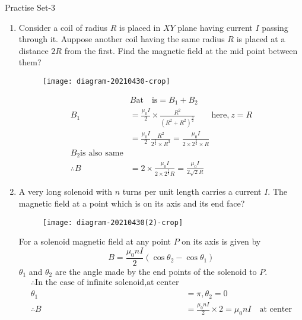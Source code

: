 \newpage
\begin{abox}
	Practise Set-3
\end{abox}
\begin{enumerate}[ label=\color{ocre}\textbf{\arabic*.}]
	\item Consider a coil of radius $R$ is placed in $XY$ plane having current $I$ passing through it. Auppose another coil having the same radius $R$ is placed at a distance $2R$ from the first. Find the magnetic field at the mid point between them?
	\begin{figure}[H]
		\begin{center}
			\texttt{[image: diagram-20210430-crop]}
		\end{center}
	\end{figure}
	\begin{answer}
		\begin{align*}
		&B \text{at}\quad\text{is}=B_1+B_2\\
		B_1&=\frac{\mu_{0} I}{2}\times\frac{R^2}{(R^2+R^2)^\frac{3}{2}}\qquad \text{here,}\ z=R\\
		&=\frac{\mu_0 I}{2}\frac{R^2}{2^\frac{3}{2}\times R^3}=\frac{\mu_0 I}{2\times2^\frac{3}{2}\times R}\\
		B_2 \text{is also same}\\
		\therefore B&=2\times\frac{\mu_0 I}{2\times2^\frac{2}{3}R}=\frac{\mu_0I}{2\sqrt{2}R}
		\end{align*}
	\end{answer}
	\item  A very long solenoid with $n$ turns per unit length carries a current $I$. The magnetic field at a point which is on its axis and its end face?
	\begin{figure}[H]
		\begin{center}
			\texttt{[image: diagram-20210430(2)-crop]}
		\end{center}
	\end{figure}
	\begin{answer}
		For a solenoid magnetic field at any point $P$ on its axis is given by
		$$B=\frac{\mu_0 nI}{2}(\cos\theta_2-\cos\theta_1)$$
		$\theta_1$ and $\theta_2$ are the angle made by the end points of the solenoid to $P$.\\
		\begin{align*}
		\therefore\text{In the case of infinite solenoid,at center}\\
		\theta_1&=\pi,\theta_2=0\\
		\therefore B&=\frac{\mu_0 nI}{2}\times2=\mu_0 nI \quad\text{at center}\\

\end{align*}
\end{answer}
\end{enumerate}
